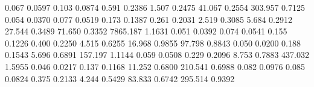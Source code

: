0.067     0.0597  %
0.103     0.0874  %
0.591     0.2386  %
1.507     0.2475  %
41.067    0.2554  %
303.957   0.7125  %
0.054     0.0370  %
0.077     0.0519  %
0.173     0.1387  %
0.261     0.2031  %
2.519     0.3085  %
5.684     0.2912  %
27.544    0.3489  %
71.650    0.3352  %
7865.187  1.1631  %
0.051     0.0392  %
0.074     0.0541  %
0.155     0.1226  %
0.400     0.2250  %
4.515     0.6255  %
16.968    0.9855  %
97.798    0.8843  %
0.050     0.0200  %
0.188     0.1543  %
5.696     0.6891  %
157.197   1.1144  %
0.059     0.0508  %
0.229     0.2096  %
8.753     0.7883  %
437.032   1.5955  %
0.046     0.0217  %
0.137     0.1168  %
11.252    0.6800  %
210.541   0.6988  %
0.082     0.0976  %
0.085     0.0824  %
0.375     0.2133  %
4.244     0.5429  %
83.833    0.6742  %
295.514   0.9392  %
